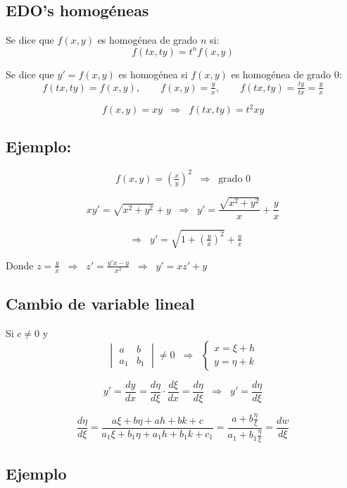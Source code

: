 \documentclass[a4paper,12pt]{article}
\begin{document}
\subsection{EDO’s homogéneas}

Se dice que $f(x,y)$ es homogénea de grado $n$ si:
\[
f(tx,ty) = t^n f(x,y)
\]

Se dice que $y' = f(x,y)$ es homogénea si $f(x,y)$ es homogénea de grado 0:
\[
f(tx,ty) = f(x,y), 
\qquad 
f(x,y) = \tfrac{y}{x},
\qquad
f(tx,ty) = \tfrac{ty}{tx} = \tfrac{y}{x}
\]

\[
f(x,y) = xy \;\;\Rightarrow\;\; f(tx,ty) = t^2 xy
\]

\subsection*{Ejemplo:}

\[
f(x,y) = \left(\tfrac{x}{y}\right)^2 \;\;\Rightarrow\;\; \text{grado 0}
\]

\[
x y' = \sqrt{x^2 + y^2} + y 
\;\;\Rightarrow\;\;
y' = \frac{\sqrt{x^2 + y^2}}{x} + \frac{y}{x}
\]

\[
\;\;\Rightarrow\;\; y' = \sqrt{1 + \left(\tfrac{y}{x}\right)^2} + \tfrac{y}{x}
\]

Donde $z = \tfrac{y}{x} \;\;\Rightarrow\;\; z' = \tfrac{y'x - y}{x^2} \;\;\Rightarrow\;\; y' = x z' + y$

\subsection{Cambio de variable lineal}

Si $c \neq 0$ y 
\[
\begin{vmatrix}
a & b \\
a_1 & b_1
\end{vmatrix} \neq 0
\;\;\Rightarrow\;\;
\begin{cases}
x = \xi + h \\
y = \eta + k
\end{cases}
\]

\[
y' = \frac{dy}{dx} = \frac{d\eta}{d\xi}\cdot \frac{d\xi}{dx} 
= \frac{d\eta}{d\xi} \;\;\Rightarrow\;\; y' = \frac{d\eta}{d\xi}
\]

\[
\frac{d\eta}{d\xi} = 
\frac{a\xi + b\eta + ah + bk + c}{a_1\xi + b_1\eta + a_1 h + b_1 k + c_1}
= \frac{a + b\frac{\eta}{\xi}}{a_1 + b_1\frac{\eta}{\xi}}
= \frac{dw}{d\xi}
\]

\subsection*{Ejemplo}
\end{document}
